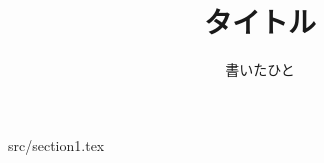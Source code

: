 \documentclass[11pt,a4paper]{jsarticle}
\title {タイトル}
\author {書いたひと}
\begin{document}
\maketitle
\newpage
\tableofcontents
\newpage
 {src/section1.tex}
\end{document}
